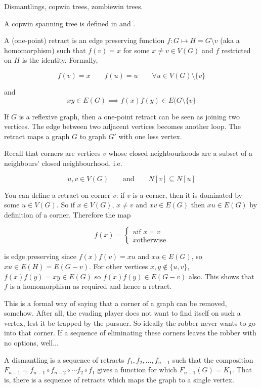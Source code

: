 Dismantlings, copwin trees, zombiewin trees.

A copwin spanning tree is defined in \cite{fitzpatrick2016deterministic}
and \cite{clarke2002constrained}.

A (one-point) retract is an edge preserving function $f : G \mapsto H = G \setminus v$
(aka a homomorphism) such that $f(v) = x$ for some $x \neq v \in V(G)$ and $f$ restricted on $H$ is the identity.
Formally,

\[ f(v) = x \qquad f(u) = u \qquad \forall u \in V(G)\setminus \{ v \} \]

and
\[ xy \in E(G) \implies f(x)f(y) \in E(G \setminus \{ v \} \]

If $G$ is a reflexive graph, then a one-point retract can be seen as joining
two vertices. The edge between two adjacent vertices becomes another loop.
The retract maps a graph $G$ to graph $G'$ with one less vertex.

Recall that corners are vertices $v$ whose closed neighbourhoods
are a subset of a neighbours' closed neighbourhood, i.e.

\[u,v\in V(G) \qquad \text{and} \qquad N[v] \subseteq N[u] \]

You can define a retract on corner $v$: if $v$ is a corner, then it is
dominated by some $u \in V(G)$. So if $x \in V(G)$, $x \neq v$ and
$xv \in E(G)$ then $xu \in E(G)$ by definition of a corner. Therefore the map

\[ f(x) = \begin{cases}
u \text{if } x = v \\
x \text{otherwise}
\end{cases} \]

is edge preserving since $f(x)f(v) = xu$ and $xu \in E(G)$, so $xu \in E(H) = E(G - v)$.
For other vertices $x,y \not\in \{u,v\}$, $f(x)f(y) = xy \in E(G)$ so $f(x)f(y) \in E(G- v)$ also.
This shows that $f$ is a homomorphism as required and hence a retract.

This is a formal way of saying that a corner of a graph can be removed, somehow.
After all, the evading player does not want to find itself on such a vertex, lest
it be trapped by the pursuer. So ideally the robber never wants to go into that corner.
If a sequence of eliminating these corners leaves the robber with no options, well...

A dismantling is a sequence of retracts $f_1, f_2, \dots, f_{n-1}$ such that the
composition $F_{n-1} = f_{n-1} \circ f_{n-2} \circ \cdots f_2 \circ f_1$ gives a
function for which $F_{n-1} (G) = K_1$. That is, there is a sequence of retracts
which maps the graph to a single vertex.

